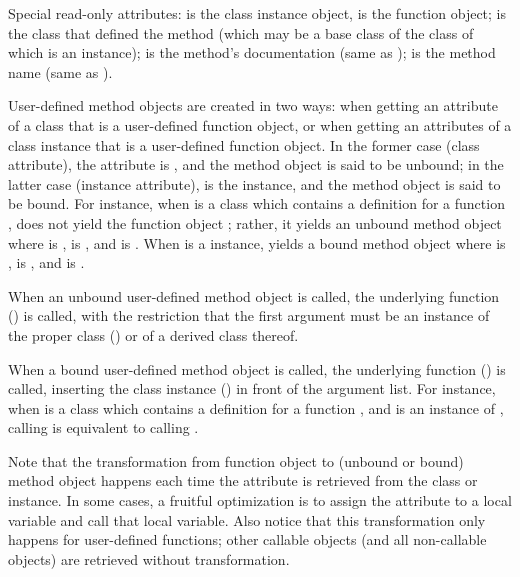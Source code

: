 \begin{description}
\begin{description}
Special read-only attributes:  is the class instance
object,  is the function object;
 is the class that defined the method (which may be a
base class of the class of which  is an instance);
 is the method's documentation (same as
);  is the method name (same as
).

User-defined method objects are created in two ways: when getting an
attribute of a class that is a user-defined function object, or when
getting an attributes of a class instance that is a user-defined
function object.  In the former case (class attribute), the
 attribute is , and the method object is said
to be unbound; in the latter case (instance attribute), 
is the instance, and the method object is said to be bound.  For
instance, when  is a class which contains a definition for a
function ,  does not yield the function object
; rather, it yields an unbound method object  where
 is ,  is , and
 is .  When  is a 
instance,  yields a bound method object  where
 is ,  is , and
 is .

When an unbound user-defined method object is called, the underlying
function () is called, with the restriction that the
first argument must be an instance of the proper class
() or of a derived class thereof.

When a bound user-defined method object is called, the underlying
function () is called, inserting the class instance
() in front of the argument list.  For instance, when
 is a class which contains a definition for a function
, and  is an instance of , calling
 is equivalent to calling .

Note that the transformation from function object to (unbound or
bound) method object happens each time the attribute is retrieved from
the class or instance.  In some cases, a fruitful optimization is to
assign the attribute to a local variable and call that local variable.
Also notice that this transformation only happens for user-defined
functions; other callable objects (and all non-callable objects) are
retrieved without transformation.


\end{description}
\end{description}

